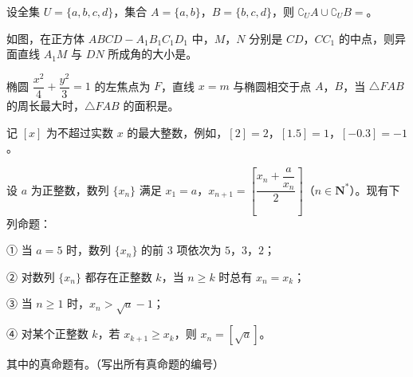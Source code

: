\begin{question}
设全集 $U=\{a,b,c,d\}$，集合 $A=\{a,b\}$，$B=\{b,c,d\}$，则 $\complement_U A\cup\complement_U B=$\gkblank{}。

\Needspace{0.4\textheight}
\end{question}
\begin{question}
如图，在正方体 $ABCD-A_1B_1C_1D_1$ 中，$M$，$N$ 分别是 $CD$，$CC_1$ 的中点，则异面直线 $A_1M$ 与 $DN$ 所成角的大小是\gkblank{}。
\nopagebreak[4]
\begin{center}\end{center}
\nopagebreak[4]
\end{question}
\begin{question}
椭圆 $\dfrac{x^2}4+\dfrac{y^2}3=1$ 的左焦点为 $F$，直线 $x=m$ 与椭圆相交于点 $A$，$B$，当 $\triangle FAB$ 的周长最大时，$\triangle FAB$ 的面积是\gkblank{}。

\end{question}
\begin{question}
记 $[x]$ 为不超过实数 $x$ 的最大整数，例如，$[2]=2$，$[1.5]=1$，$[-0.3]=-1$。

设 $a$ 为正整数，数列 $\{x_n\}$ 满足 $x_1=a$，$x_{n+1}=\left[\dfrac{x_n+\dfrac{a}{x_n}}{2}\right]$（$n\in\mathbf N^*$）。现有下列命题：

① 当 $a=5$ 时，数列 $\{x_n\}$ 的前 $3$ 项依次为 $5$，$3$，$2$；

② 对数列 $\{x_n\}$ 都存在正整数 $k$，当 $n\geqslant k$ 时总有 $x_n=x_k$；

③ 当 $n\geqslant1$ 时，$x_n>\sqrt a-1$；

④ 对某个正整数 $k$，若 $x_{k+1}\geqslant x_k$，则 $x_n=[\sqrt a]$。

其中的真命题有\gkblank{}。（写出所有真命题的编号）

\end{question}

